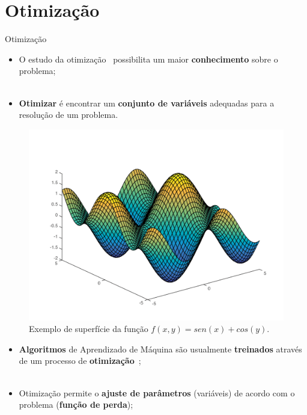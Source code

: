 \section{Otimização}
\label{s.optimization}

\begin{frame}{Otimização}
	\begin{itemize}
		\justifying
		\item O estudo da otimização~\cite{bertsekas99} possibilita um maior \textbf{conhecimento} sobre o problema;
		\\~\\
		\item \textbf{Otimizar} é encontrar um \textbf{conjunto de variáveis} adequadas para a resolução de um problema.
		\end{itemize}
\end{frame}

\begin{frame}
	\begin{figure}
		\centering
		\includegraphics[scale=0.45]{figs/opt_function.png}	
		\caption{Exemplo de superfície da função $f(x,y)=sen(x)+cos(y)$.}
		\label{f.opt_function}
	\end{figure}
\end{frame}

\begin{frame}
	\begin{itemize}
		\justifying
		\item \textbf{Algoritmos} de Aprendizado de Máquina são usualmente \textbf{treinados} através de um processo de \textbf{otimização}~\cite{Lan:20};
		\\~\\
		\item Otimização permite o \textbf{ajuste de parâmetros} (variáveis) de acordo com o problema (\textbf{função de perda});
	\end{itemize}
\end{frame}

